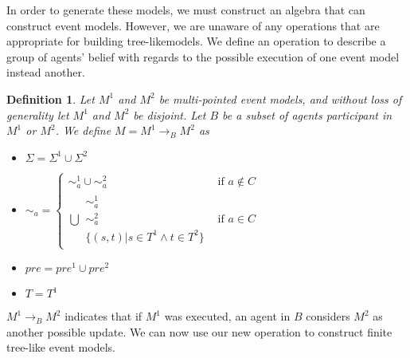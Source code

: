 \documentclass[12pt, a4paper, titlepage]{scrartcl}
\newtheorem{defn}{Definition}
\begin{document}
In order to generate these models, we must construct an algebra that can construct event models.
However, we are unaware of any operations that are appropriate for building tree-likemodels.
We define an operation to describe a group of agents' belief with regards to the possible execution
of one event model instead another.

\begin{defn} \label{possOne}
Let $M^1$ and $M^2$ be multi-pointed event models, and without loss of
generality let $M^1$ and $M^2$ be disjoint.
Let $B$ be a subset of agents participant in $M^1$ or $M^2$.
We define $M = M^1 \to_B M^2$ as 
\begin{itemize}
  \item $\Sigma = \Sigma^1 \cup \Sigma^2$
  \item $\sim_a =
  \begin{cases}
    \sim^1_a \cup \sim^2_a & \text{if } a \notin C \\
    \displaystyle\bigcup \begin{array}{c}
      \sim^1_a \\
      \sim^2_a \\
      \{(s,t) | s \in T^1 \land t \in T^2 \}
    \end{array} & \text{if } a \in C 
  \end{cases}$
  \item $pre = pre^1 \cup pre^2$
  \item $T = T^1$
\end{itemize}
\end{defn}

$M^1 \to_B M^2$ indicates that if $M^1$ was executed, an agent in $B$ considers $M^2$ as another
possible update.
We can now use our new operation to construct finite tree-like event models.

\end{document}
